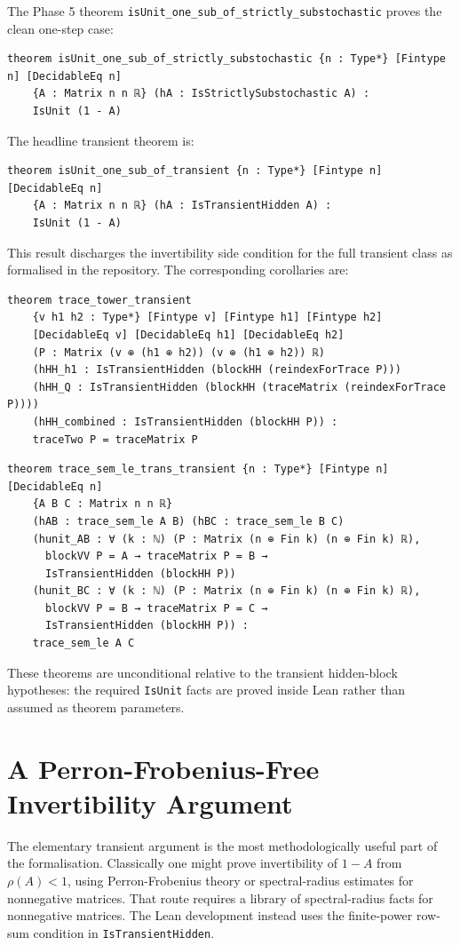 \documentclass[11pt]{article}
\begin{document}
The Phase 5 theorem \texttt{isUnit_one_sub_of_strictly_substochastic} proves the clean one-step case:
\begin{lstlisting}[style=lean]
theorem isUnit_one_sub_of_strictly_substochastic {n : Type*} [Fintype n] [DecidableEq n]
    {A : Matrix n n ℝ} (hA : IsStrictlySubstochastic A) :
    IsUnit (1 - A)
\end{lstlisting}
The headline transient theorem is:
\begin{lstlisting}[style=lean]
theorem isUnit_one_sub_of_transient {n : Type*} [Fintype n] [DecidableEq n]
    {A : Matrix n n ℝ} (hA : IsTransientHidden A) :
    IsUnit (1 - A)
\end{lstlisting}
This result discharges the invertibility side condition for the full transient class as formalised in the repository.
The corresponding corollaries are:
\begin{lstlisting}[style=lean]
theorem trace_tower_transient
    {v h1 h2 : Type*} [Fintype v] [Fintype h1] [Fintype h2]
    [DecidableEq v] [DecidableEq h1] [DecidableEq h2]
    (P : Matrix (v ⊕ (h1 ⊕ h2)) (v ⊕ (h1 ⊕ h2)) ℝ)
    (hHH_h1 : IsTransientHidden (blockHH (reindexForTrace P)))
    (hHH_Q : IsTransientHidden (blockHH (traceMatrix (reindexForTrace P))))
    (hHH_combined : IsTransientHidden (blockHH P)) :
    traceTwo P = traceMatrix P
\end{lstlisting}
\begin{lstlisting}[style=lean]
theorem trace_sem_le_trans_transient {n : Type*} [Fintype n] [DecidableEq n]
    {A B C : Matrix n n ℝ}
    (hAB : trace_sem_le A B) (hBC : trace_sem_le B C)
    (hunit_AB : ∀ (k : ℕ) (P : Matrix (n ⊕ Fin k) (n ⊕ Fin k) ℝ),
      blockVV P = A → traceMatrix P = B →
      IsTransientHidden (blockHH P))
    (hunit_BC : ∀ (k : ℕ) (P : Matrix (n ⊕ Fin k) (n ⊕ Fin k) ℝ),
      blockVV P = B → traceMatrix P = C →
      IsTransientHidden (blockHH P)) :
    trace_sem_le A C
\end{lstlisting}
These theorems are unconditional relative to the transient hidden-block hypotheses: the required \texttt{IsUnit} facts are proved inside Lean rather than assumed as theorem parameters.

\section{A Perron-Frobenius-Free Invertibility Argument}

The elementary transient argument is the most methodologically useful part of the formalisation.
Classically one might prove invertibility of \(1-A\) from \(\rho(A)<1\), using Perron-Frobenius theory or spectral-radius estimates for nonnegative matrices.
That route requires a library of spectral-radius facts for nonnegative matrices.
The Lean development instead uses the finite-power row-sum condition in \texttt{IsTransientHidden}.
\end{document}
